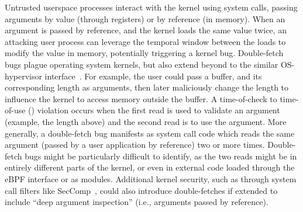 Untrusted userspace processes interact with the kernel using system calls,
passing arguments by value (through registers) or by reference (in memory).
When an argument is passed by reference, and the kernel loads the same
value twice, an attacking user process can leverage the temporal window 
between the loads to modify the value in memory, potentially triggering a
kernel bug.
Double-fetch bugs plague operating system kernels, but also extend beyond
to the similar OS-hypervisor interface~\cite{cve201812633, cve202012652, 
cve20131332, cve201920610,cve20158550, cve201610439, cve201610435, 
cve201610433, cve20195519,cve20168438}.
For example, the user could pass a buffer, and its corresponding length
as arguments, then later maliciously change the length to influence the
kernel to access memory outside the buffer.
A time-of-check to time-of-use (\tocttou) violation occurs when the
first read is used to validate an argument (example, the length above)
and the second read is to use the argument.
More generally, a double-fetch bug manifests as system call code which reads
the same argument (passed by a user application by reference) two or more
times.
Double-fetch bugs might be particularly difficult to identify, as the two
reads might be in entirely different parts of the kernel, or even in external
code loaded through the eBPF interface or as modules.
Additional kernel security, such as through system call filters like 
SecComp~\cite{seccomp}, could also introduce double-fetches if extended to
include ``deep argument inspection'' (i.e., arguments passed by reference).

